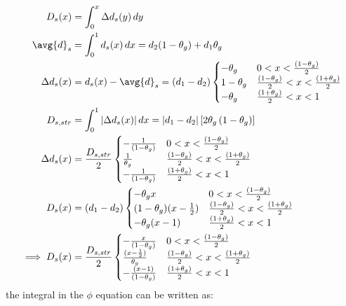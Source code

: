 \begin{equation}
\begin{split}
D_s(x) &= \int_{0}^{x} \Delta d_s(y) \, dy\\
\avg{d}_s &= \int_{0}^{1} d_s(x) \,dx = d_{2} (1-\theta_g) + d_{1} \theta_g\\
\Delta d_s(x) &= d_s(x) - \avg{d}_s = \left(d_{1}-d_{2}\right) 
\begin{cases} -\theta_g & 0 < x < \frac{(1- \theta_{g})}{2} \\
1-\theta_g & \frac{(1- \theta_{g})}{2} < x < \frac{(1+ \theta_{g})}{2}  \\
-\theta_g &  \frac{(1+ \theta_{g})}{2}  < x < 1\end{cases}\\
D_{s,str} &= \int_{0}^{1} |\Delta d_s(x)| \, dx = |d_{1} - d_{2}|\left[2\theta_g\left(1-\theta_g\right)\right]\\
\Delta d_s(x) &= \frac{D_{s,str}}{2}
\begin{cases} -\frac{1}{\left(1-\theta_g\right)} & 0 < x < \frac{(1- \theta_{g})}{2} \\
\frac{1}{\theta_g} & \frac{(1- \theta_{g})}{2} < x < \frac{(1+ \theta_{g})}{2}  \\
-\frac{1}{\left(1-\theta_g\right)} &  \frac{(1+ \theta_{g})}{2}  < x < 1\end{cases}\\
D_s(x) &= \left(d_{1}-d_{2}\right) \begin{cases} -\theta_g x & 0 < x < \frac{(1- \theta_{g})}{2} \\
(1-\theta_g) (x-\frac{1}{2}) & \frac{(1- \theta_{g})}{2} < x < \frac{(1+ \theta_{g})}{2}  \\
-\theta_g (x-1) &  \frac{(1+ \theta_{g})}{2}  < x < 1\end{cases}\\
\implies D_s(x) &= \frac{D_{s,str}}{2}  \begin{cases} - \frac{x}{(1- \theta_{g})} & 0 < x < \frac{(1- \theta_{g})}{2} \\
\frac{(x-\frac{1}{2})}{\theta_g}  & \frac{(1- \theta_{g})}{2} < x < \frac{(1+ \theta_{g})}{2}  \\
- \frac{(x-1)}{(1- \theta_{g})} &  \frac{(1+ \theta_{g})}{2}  < x < 1\end{cases}
\end{split}
\end{equation}
the integral in the $\phi$ equation can be written as:
